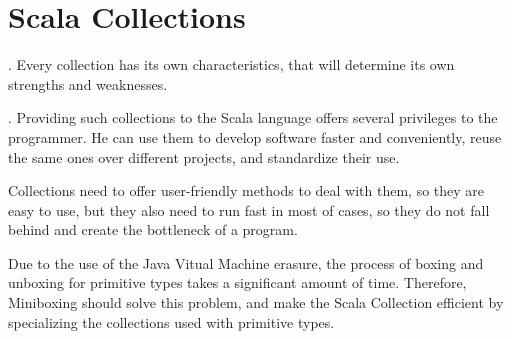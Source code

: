 \section{Scala Collections}



. Every collection has its own characteristics, that will determine its own strengths and weaknesses.

. Providing such collections to the Scala language offers several privileges to the programmer. He can use them to develop software faster and conveniently, reuse the same ones over different projects, and standardize their use.

 Collections need to offer user-friendly methods to deal with them, so they are easy to use, but they also need to run fast in most of cases, so they do not fall behind and create the bottleneck of a program. 

 Due to the use of the Java Vitual Machine erasure, the process of boxing and unboxing for primitive types takes a significant amount of time. Therefore, Miniboxing should solve this problem, and make the Scala Collection efficient by specializing the collections used with primitive types.

% 
% 
% 


